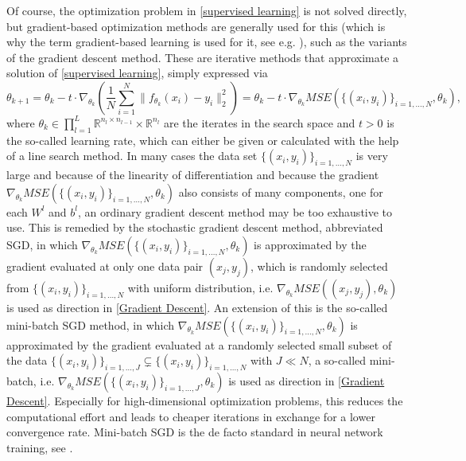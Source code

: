 Of course, the optimization problem in \cref{supervised learning} is not solved directly, but gradient-based optimization methods are generally used for this (which is why the term gradient-based learning is used for it, see e.g. \cite[p.~177]{GoodfellowBengioCourville:2016}), such as the variants of the gradient descent method. These are iterative methods that approximate a solution of \cref{supervised learning}, simply expressed via 
\begin{equation}
    \label{Gradient Descent}
    \theta_{k+1} = \theta_k - t \cdot \nabla_{\theta_k} \left( \frac{1}{N}\sum_{i=1}^{N} \lVert f_{\theta_k} \left(x_{i}\right) - y_{i}\rVert^{2}_2 \right) = \theta_k - t \cdot \nabla_{\theta_k} MSE(\{ (x_i, y_i) \}_{i = 1, \ldots, N}, \theta_k),
\end{equation}
where $\theta_k \in \prod^L_{l=1}  \mathbb{R}^{n_l \times n_{l-1}} \times \mathbb{R}^{n_l}$ are the iterates in the search space and $t > 0$ is the so-called learning rate, which can either be given or calculated with the help of a line search method. In many cases the data set $\{ (x_i, y_i) \}_{i = 1, \ldots, N}$ is very large and because of the linearity of differentiation and because the gradient $\nabla_{\theta_k} MSE(\{ (x_i, y_i) \}_{i = 1, \ldots, N}, \theta_k)$ also consists of many components, one for each $W^l$ and $b^l$, an ordinary gradient descent method may be too exhaustive to use. This is remedied by the stochastic gradient descent method, abbreviated SGD, in which $\nabla_{\theta_k} MSE(\{ (x_i, y_i) \}_{i = 1, \ldots, N}, \theta_k)$ is approximated by the gradient evaluated at only one data pair $(x_j, y_j)$, which is randomly selected from $\{ (x_i, y_i) \}_{i = 1, \ldots, N}$ with uniform distribution, i.e. $\nabla_{\theta_k} MSE((x_j, y_j), \theta_k)$ is used as direction in \cref{Gradient Descent}. An extension of this is the so-called mini-batch SGD method, in which $\nabla_{\theta_k} MSE(\{ (x_i, y_i) \}_{i = 1, \ldots, N}, \theta_k)$ is approximated by the gradient evaluated at a randomly selected small subset  of the data $\{ (x_i, y_i) \}_{i = 1, \ldots, J} \subsetneq  \{ (x_i, y_i) \}_{i = 1, \ldots, N}$ with $J \ll N$, a so-called mini-batch, i.e. $\nabla_{\theta_k} MSE(\{ (x_i, y_i) \}_{i = 1, \ldots, J}, \theta_k)$ is used as direction in \cref{Gradient Descent}. Especially for high-dimensional optimization problems, this reduces the computational effort and leads to cheaper iterations in exchange for a lower convergence rate. Mini-batch SGD is the de facto standard in neural network training, see \cite[sections~5.9~+~8.3.1]{GoodfellowBengioCourville:2016}. \\

